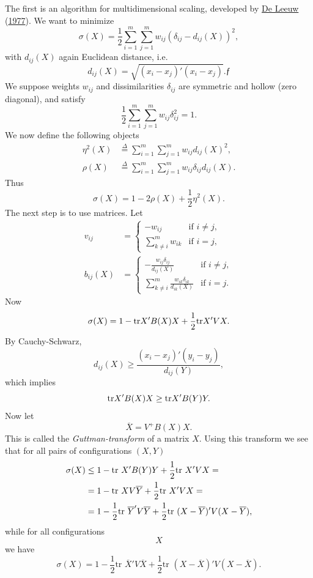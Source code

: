 \documentclass[
  12pt,
]{book}
\begin{document}
The first is an algorithm for multidimensional
scaling, developed by \protect\hyperlink{ref-deleeuw_C_77}{De Leeuw} (\protect\hyperlink{ref-deleeuw_C_77}{1977}).
We want to minimize
\[
\sigma(X)=\frac{1}{2}\sum_{i=1}^m\sum_{j=1}^m w_{ij}(\delta_{ij}-d_{ij}(X))^2,
\]
with \(d_{ij}(X)\) again Euclidean distance, i.e.
\[
d_{ij}(X)=\sqrt{(x_i-x_j)'(x_i-x_j)}.ƒ
\]
We suppose weights \(w_{ij}\) and dissimilarities \(\delta_{ij}\)
are symmetric and hollow (zero diagonal), and satisfy
\[
\frac{1}{2}\sum_{i=1}^m\sum_{j=1}^m w_{ij}\delta_{ij}^2=1.
\]
We now define the following objects
\begin{align}
\eta^2(X)&\mathop{=}\limits^{\Delta}\sum_{i=1}^m\sum_{j=1}^m w_{ij}d_{ij}(X)^2,\\
\rho(X)&\mathop{=}\limits^{\Delta}\sum_{i=1}^m\sum_{j=1}^m w_{ij}\delta_{ij}d_{ij}(X).
\end{align}
Thus
\[
\sigma(X)=1-2\rho(X)+\frac{1}{2}\eta^2(X).
\]
The next step is to use matrices. Let
\begin{align}
v_{ij}&=
\begin{cases}-w_{ij}& \text{if $i\not= j,$}\\
\sum_{k\not=i}^m w_{ik}& \text{if $i=j$,}
\end{cases}\\
b_{ij}(X)&=
\begin{cases}
-\frac{w_{ij}\delta_{ij}}{d_{ij}(X)}& \text{if $i\not= j,$}\\
\sum_{k\not=i}^m\frac{w_{ik}\delta_{ik}}{d_{ik}(X)}& \text{if $i=j$.}
\end{cases}
\end{align}
Now
\[\sigma(X)=1-\hbox{tr}X'B(X)X+\frac{1}{2}\text{tr}X'VX.\]
By Cauchy-Schwarz,
\[
d_{ij}(X)\geq\frac{(x_i-x_j)'(y_i-y_j)}{d_{ij}(Y)},
\]
which implies
\[
\hbox{tr}X'B(X)X\geq\hbox{tr}X'B(Y)Y.
\]
Now let
\[
\overline X=V^+B(X)X.
\]
This is called the \emph{Guttman-transform} of a matrix \(X.\)
Using this transform we see that for all pairs of
configurations \((X,Y)\)
\begin{align}
\sigma(X)&\leq 1-\hbox{tr }X'B(Y)Y+\frac{1}{2}\text{tr }X'VX=\\
&=1-\hbox{tr }XV\overline Y+\frac{1}{2}\text{tr }X'VX=\\
&=1-\frac{1}{2}\text{tr }\overline Y'V\overline Y+
\frac{1}{2}\text{tr }(X-\overline Y)'V(X-\overline Y),
\end{align}
while for all configurations \[X\] we have
\[
\sigma(X)=1-\frac{1}{2}\text{tr }\overline X'V\overline X+
\frac{1}{2}\text{tr }(X-\overline X)'V(X-\overline X).
\]
\end{document}
